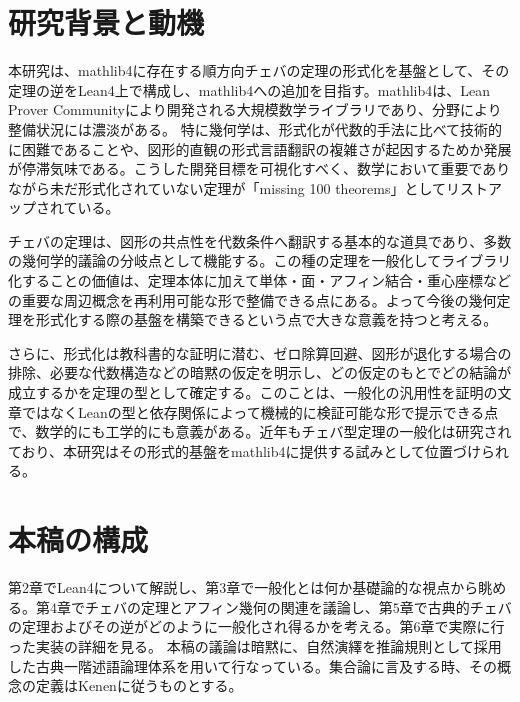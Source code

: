 \documentclass[a4paper,12pt]{bxjsbook}
\newlength{\customindent}
\newenvironment{body}{
  \par
  \begingroup
  \setlength{\leftskip}{\customindent}
  \setlength{\rightskip}{0pt}
  \setlength{\parindent}{1em}
  \setlength{\displayindent}{\customindent}
  \setlength{\displaywidth}{\dimexpr\linewidth-\customindent\relax}
}{
  \par
  \endgroup
}
\theoremstyle{theorem}
\begin{document}
    \section{研究背景と動機}
    \begin{body}
        \indent 本研究は、mathlib4に存在する順方向チェバの定理の形式化を基盤として、その定理の逆をLean4上で構成し、mathlib4への追加を目指す。mathlib4は、Lean Prover Communityにより開発される大規模数学ライブラリ\cite{LeanProverCommunity}であり、分野により整備状況には濃淡がある。
        特に幾何学は、形式化が代数的手法に比べて技術的に困難であることや、図形的直観の形式言語翻訳の複雑さが起因するためか発展が停滞気味である。こうした開発目標を可視化すべく、数学において重要でありながら未だ形式化されていない定理が「missing 100 theorems」としてリストアップされている。

        \indent チェバの定理は、図形の共点性を代数条件へ翻訳する基本的な道具であり、多数の幾何学的議論の分岐点として機能する。この種の定理を一般化してライブラリ化することの価値は、定理本体に加えて単体・面・アフィン結合・重心座標などの重要な周辺概念を再利用可能な形で整備できる点にある。よって今後の幾何定理を形式化する際の基盤を構築できるという点で大きな意義を持つと考える。

        \indent さらに、形式化は教科書的な証明に潜む、ゼロ除算回避、図形が退化する場合の排除、必要な代数構造などの暗黙の仮定を明示し、どの仮定のもとでどの結論が成立するかを定理の型として確定する。このことは、一般化の汎用性を証明の文章ではなくLeanの型と依存関係によって機械的に検証可能な形で提示できる点で、数学的にも工学的にも意義がある。近年もチェバ型定理の一般化は研究されており、本研究はその形式的基盤をmathlib4に提供する試みとして位置づけられる。
    \end{body}

    \section{本稿の構成}
    \begin{body}
        \indent 第$2$章でLean4について解説し、第$3$章で一般化とは何か基礎論的な視点から眺める。第$4$章でチェバの定理とアフィン幾何の関連を議論し、第$5$章で古典的チェバの定理およびその逆がどのように一般化され得るかを考える。第$6$章で実際に行った実装の詳細を見る。
        \indent 本稿の議論は暗黙に、自然演繹を推論規則として採用した古典一階述語論理体系を用いて行なっている。集合論に言及する時、その概念の定義はKenenに従うものとする。\cite{Kunen}
    \end{body}
\end{document}
